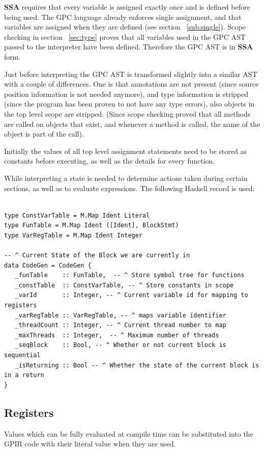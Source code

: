 \textbf{SSA}\cite{sccp, brandis94} 
requires that every variable is assigned exactly once and is defined before being
used. The GPC language already enforces single assignment, and that variables are assigned
when they are defined (see section ~\ref{sub:single}). 
Scope checking in section ~\ref{sec:type} proves that all variables used in
the GPC AST passed to the interpreter have been defined. Therefore the GPC
AST is in \textbf{SSA} form.

Just before interpreting the GPC AST is transformed slightly into a similar AST
with a couple of differences. One is that annotations are not present (since source position information
is not needed anymore), and type information is stripped (since the program has been proven to 
not have any type errors), also objects in the top level scope are stripped. (Since scope checking
proved that all methods are called on objects that exist, and whenever a method is called, the
name of the object is part of the call).

Initially the values of all top level assignment statements need to be stored
as constants before executing, as well as the details for every function.

While interpreting a state is needed to determine actions taken
during certain sections, as well as to evaluate expressions.
The following Haskell record is used:

\begin{lstlisting}[style=myHaskell]

type ConstVarTable = M.Map Ident Literal
type FunTable = M.Map Ident ([Ident], BlockStmt)
type VarRegTable = M.Map Ident Integer

-- ^ Current State of the Block we are currently in
data CodeGen = CodeGen {
   _funTable    :: FunTable,  -- ^ Store symbol tree for functions
   _constTable  :: ConstVarTable, -- ^ Store constants in scope
   _varId       :: Integer, -- ^ Current variable id for mapping to registers
   _varRegTable :: VarRegTable, -- ^ maps variable identifier
   _threadCount :: Integer, -- ^ Current thread number to map
   _maxThreads  :: Integer,  -- ^ Maximum number of threads
   _seqBlock    :: Bool, -- ^ Whether or not current block is sequential
   _isReturning :: Bool -- ^ Whether the state of the current block is in a return
}

\end{lstlisting}


\subsection{Registers}
Values which can be fully evaluated at compile time can be substituted into the
GPIR code with their literal value when they are used.

